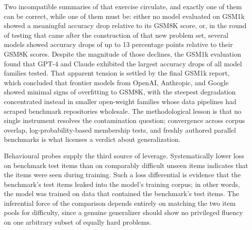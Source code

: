 \documentclass[11pt]{article}
\begin{document}
{Two incompatible summaries of that exercise circulate, and exactly one of them can be correct, while one of them must be: either no model evaluated on GSM1k showed a meaningful accuracy drop relative to its GSM8K score, or, in the round of testing that came after the construction of that new problem set, several models showed accuracy drops of up to 13 percentage points relative to their GSM8K scores. Despite the magnitude of those declines, the GSM1k evaluation found that GPT-4 and Claude exhibited the largest accuracy drops of all model families tested. That apparent tension is settled by the final GSM1k report, which concluded that frontier models from OpenAI, Anthropic, and Google showed minimal signs of overfitting to GSM8K, with the steepest degradation concentrated instead in smaller open-weight families whose data pipelines had scraped benchmark repositories wholesale. The methodological lesson is that no single instrument resolves the contamination question; convergence across corpus overlap, log-probability-based membership tests, and freshly authored parallel benchmarks is what licenses a verdict about generalization.

Behavioural probes supply the third source of leverage. Systematically lower loss on benchmark test items than on comparably difficult unseen items indicates that the items were seen during training. Such a loss differential is evidence that the benchmark's test items leaked into the model's training corpus; in other words, the model was trained on data that contained the benchmark's test items. The inferential force of the comparison depends entirely on matching the two item pools for difficulty, since a genuine generalizer should show no privileged fluency on one arbitrary subset of equally hard problems.}
\end{document}
